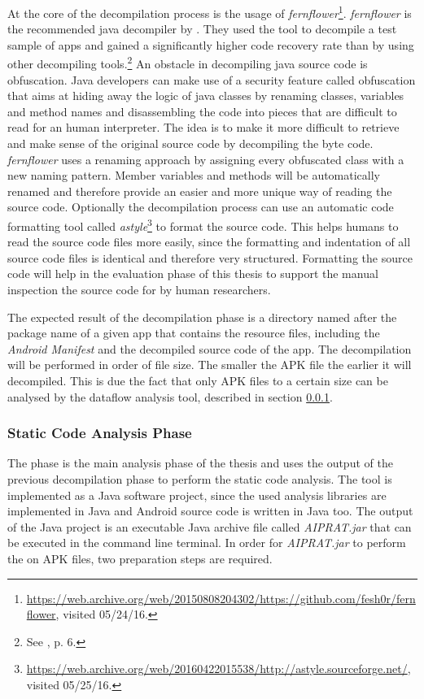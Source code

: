 At the core of the decompilation process is the usage of \textit{fernflower}\footnote{\url{https://web.archive.org/web/20150808204302/https://github.com/fesh0r/fernflower}, visited 05/24/16.}.
\textit{fernflower} is the recommended java decompiler by \cite{Enck2011}. 
They used the tool to decompile a test sample of apps and gained a significantly higher code recovery rate than by using other decompiling tools.\footnote{See \cite{Enck2011}, p. 6.}
An obstacle in decompiling java source code is obfuscation. 
Java developers can make use of a security feature called obfuscation that aims at hiding away the logic of java classes by renaming classes, variables and method names and disassembling the code into pieces that are difficult to read for an human interpreter.
The idea is to make it more difficult to retrieve and make sense of the original source code by decompiling the byte code.
\textit{fernflower} uses a renaming approach by assigning every obfuscated class with a new naming pattern. 
Member variables and methods will be automatically renamed and therefore provide an easier and more unique way of reading the source code.
Optionally the decompilation process can use an automatic code formatting tool called \textit{astyle}\footnote{\url{https://web.archive.org/web/20160422015538/http://astyle.sourceforge.net/}, visited 05/25/16.} to format the source code.
This helps humans to read the source code files more easily, since the formatting and indentation of all source code files is identical and therefore very structured.
Formatting the source code will help in the evaluation phase of this thesis to support the manual inspection the source code for \ipr by human researchers.

The expected result of the decompilation phase is a directory named after the package name of a given app that contains the resource files, including the \textit{Android Manifest} and the decompiled source code of the app.
The decompilation will be performed in order of file size.
The smaller the APK file the earlier it will decompiled.
This is due the fact that only APK files to a certain size can be analysed by the dataflow analysis tool, described in section \ref{sssec:SCAP}.

\subsubsection{Static Code Analysis Phase} \label{sssec:SCAP}

The \sca phase is the main analysis phase of the thesis and uses the output of the previous decompilation phase to perform the static code analysis.
The \sca tool is implemented as a Java software project, since the used analysis libraries are implemented in Java and Android source code is written in Java too.
The output of the \sca Java project is an executable Java archive file called \textit{AIPRAT.jar} that can be executed in the command line terminal.
In order for \textit{AIPRAT.jar} to perform the \sca on APK files, two preparation steps are required.

